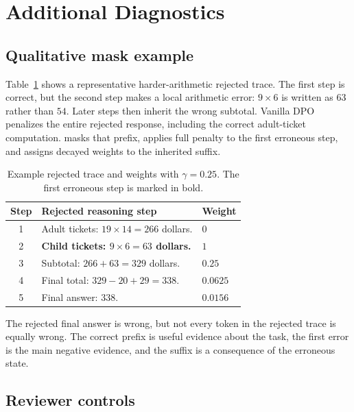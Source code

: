 \section{Additional Diagnostics}

\subsection{Qualitative mask example}
\label{app:qual-example}

Table~\ref{tab:qual-example} shows a representative harder-arithmetic rejected trace. The first step is correct, but the second step makes a local arithmetic error: $9 \times 6$ is written as $63$ rather than $54$. Later steps then inherit the wrong subtotal. Vanilla DPO penalizes the entire rejected response, including the correct adult-ticket computation. \cmdpo{} masks that prefix, applies full penalty to the first erroneous step, and assigns decayed weights to the inherited suffix.

\begin{table}[h]
\caption{Example rejected trace and \cmdpo{} weights with $\gamma=0.25$. The first erroneous step is marked in bold.}
\label{tab:qual-example}
\begin{center}
\begin{tabular}{cll}
\toprule
Step & Rejected reasoning step & Weight \\
\midrule
1 & Adult tickets: $19 \times 14 = 266$ dollars. & $0$ \\
2 & \textbf{Child tickets: $9 \times 6 = 63$ dollars.} & $1$ \\
3 & Subtotal: $266 + 63 = 329$ dollars. & $0.25$ \\
4 & Final total: $329 - 20 + 29 = 338$. & $0.0625$ \\
5 & Final answer: $338$. & $0.0156$ \\
\bottomrule
\end{tabular}
\end{center}
\end{table}

The rejected final answer is wrong, but not every token in the rejected trace is equally wrong. The correct prefix is useful evidence about the task, the first error is the main negative evidence, and the suffix is a consequence of the erroneous state.

\subsection{Reviewer controls}
\label{app:diagnostics}

